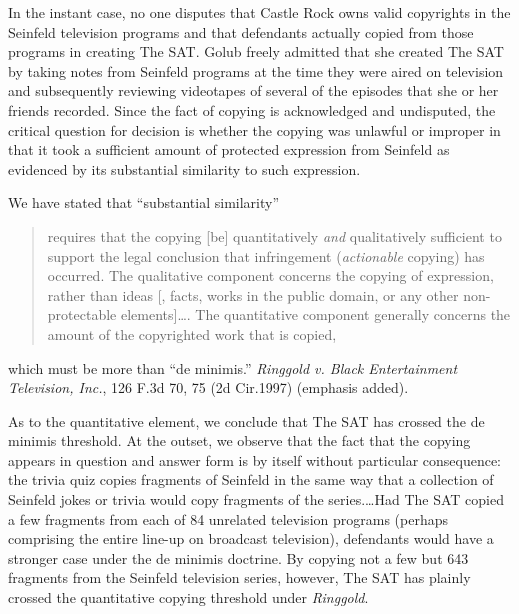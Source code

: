 In the instant case, no one disputes that Castle Rock owns valid copyrights in
the Seinfeld television programs and that defendants actually copied from those
programs in creating The SAT. Golub freely admitted that she created The SAT by
taking notes from Seinfeld programs at the time they were aired on television
and subsequently reviewing videotapes of several of the episodes that she or
her friends recorded. Since the fact of copying is acknowledged and undisputed,
the critical question for decision is whether the copying was unlawful or
improper in that it took a sufficient amount of protected expression from
Seinfeld as evidenced by its substantial similarity to such expression.


We have stated that ``substantial similarity''
\begin{quote}
requires that the copying [be] quantitatively \textit{and} qualitatively
sufficient to support the legal conclusion that infringement
(\textit{actionable} copying) has occurred. The qualitative component concerns
the copying of expression, rather than ideas [, facts, works in the public
domain, or any other non-protectable elements]\ldots. The quantitative component
generally concerns the amount of the copyrighted work that is copied,
\end{quote}
which must be more than ``de minimis.'' \emph{Ringgold v. Black Entertainment
Television, Inc.}, 126 F.3d 70, 75 (2d Cir.1997) (emphasis added).

As to the quantitative element, we conclude that The SAT has crossed the de
minimis threshold. At the outset, we observe that the fact that the copying
appears in question and answer form is by itself without particular
consequence: the trivia quiz copies fragments of Seinfeld in the same way that
a collection of Seinfeld jokes or trivia would copy fragments of the
series.\dots Had The SAT copied a few fragments from each of 84 unrelated
television
programs (perhaps comprising the entire line-up on broadcast television),
defendants would have a stronger case under the de minimis doctrine. By copying
not a few but 643 fragments from the Seinfeld television series, however, The
SAT has plainly crossed the quantitative copying threshold under
\emph{Ringgold}.


